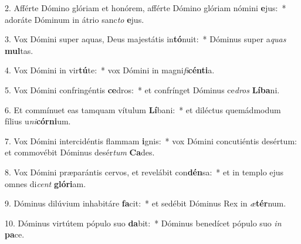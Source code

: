 2. Afférte Dómino glóriam et honórem, afférte Dómino glóriam nómini \textbf{e}jus:~*  adoráte Dóminum in átrio sanc\textit{to} \textbf{e}jus.\

3. Vox Dómini super aquas, Deus majestátis in\textbf{tó}nuit:~*  Dóminus super a\textit{quas} \textbf{mul}tas.\

4. Vox Dómini in vir\textbf{tú}te:~*  vox Dómini in magni\textit{fi}\textbf{cén}\textbf{ti}a.\

5. Vox Dómini confringéntis \textbf{ce}dros:~*  et confrínget Dóminus ce\textit{dros} \textbf{Lí}\textbf{ba}ni.\

6. Et commínuet eas tamquam vítulum \textbf{Lí}bani:~*  et diléctus quemádmodum fílius u\textit{ni}\textbf{cór}\textbf{ni}um.\

7. Vox Dómini intercidéntis flammam \textbf{i}gnis:~*  vox Dómini concutiéntis desértum: et commovébit Dóminus desér\textit{tum} \textbf{Ca}des.\

8. Vox Dómini præparántis cervos, et revelábit con\textbf{dén}sa:~*  et in templo ejus omnes di\textit{cent} \textbf{gló}\textbf{ri}am.\

9. Dóminus dilúvium inhabitáre \textbf{fa}cit:~*  et sedébit Dóminus Rex in \textit{æ}\textbf{tér}num.\

10. Dóminus virtútem pópulo suo \textbf{da}bit:~*  Dóminus benedícet pópulo suo \textit{in} \textbf{pa}ce.\

